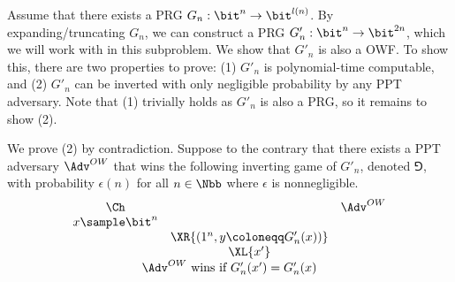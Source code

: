 \begin{answer}[b]
    Assume that there exists a PRG $G_n: \bit^n\to \bit^{l(n)}$. By expanding/truncating $G_n$, we can construct a PRG $G'_n: \bit^n\to \bit^{2n}$, which we will work with in this subproblem.
    We show that $G'_n$ is also a OWF. To show this, there are two properties to prove: (1) $G'_n$ is polynomial-time computable, and (2) $G'_n$ can be inverted with only negligible probability by any PPT adversary. Note that (1) trivially holds as $G'_n$ is also a PRG, so it remains to show (2).

    We prove (2) by contradiction. Suppose to the contrary that there exists a PPT adversary $\Adv^{OW}$ that wins the following inverting game of $G'_n$, denoted $\Game$, with probability $\epsilon(n)$ for all $n\in\Nbb$ where $\epsilon$ is nonnegligible.
    {
        \[
            \begin{array}{@{} c c c @{}}
            \Ch & & \Adv^{OW} \\
            x\sample \bit^n & & \\
            & \XR{(1^n, y\coloneqq G'_n(x))} & \\
            & \XL{x'} & \\
            \multicolumn{3}{c}{\text{$\Adv^{OW}$ wins if $G'_n(x') = G'_n(x)$}}
            \end{array}
        \]
        \label{fig:p3-game3}
    }


\end{answer}
